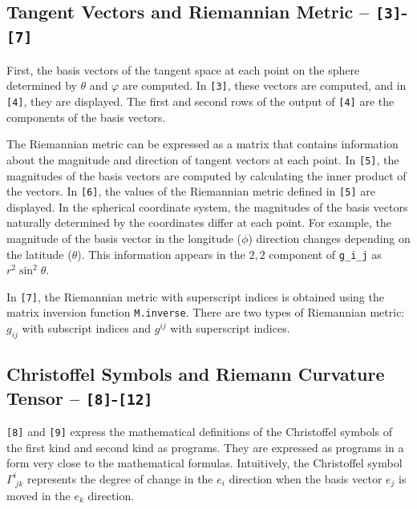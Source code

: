 \subsection{Tangent Vectors and Riemannian Metric -- \texttt{[3]}-\texttt{[7]}}

First, the basis vectors of the tangent space at each point on the sphere determined by $θ$ and $φ$ are computed.
In \texttt{[3]}, these vectors are computed, and in \texttt{[4]}, they are displayed.
The first and second rows of the output of \texttt{[4]} are the components of the basis vectors.

The Riemannian metric can be expressed as a matrix that contains information about the magnitude and direction of tangent vectors at each point.
In \texttt{[5]}, the magnitudes of the basis vectors are computed by calculating the inner product of the vectors.
In \texttt{[6]}, the values of the Riemannian metric defined in \texttt{[5]} are displayed.
In the spherical coordinate system, the magnitudes of the basis vectors naturally determined by the coordinates differ at each point.
For example, the magnitude of the basis vector in the longitude ($\phi$) direction changes depending on the latitude ($\theta$).
This information appears in the $2,2$ component of \lstinline|g_i_j| as $r^2 \sin^2 \theta$.

In \texttt{[7]}, the Riemannian metric with superscript indices is obtained using the matrix inversion function \lstinline{M.inverse}.
There are two types of Riemannian metric: $g_{ij}$ with subscript indices and $g^{ij}$ with superscript indices.

\subsection{Christoffel Symbols and Riemann Curvature Tensor -- \texttt{[8]}-\texttt{[12]}}



\texttt{[8]} and \texttt{[9]} express the mathematical definitions of the Christoffel symbols of the first kind and second kind as programs.
They are expressed as programs in a form very close to the mathematical formulas.
Intuitively, the Christoffel symbol $\Gamma^{i}_{\;jk}$ represents the degree of change in the $e_i$ direction when the basis vector $e_j$ is moved in the $e_k$ direction.

